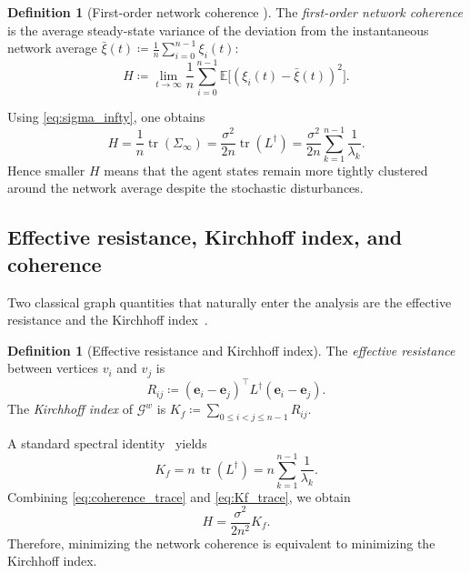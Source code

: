 \documentclass[11pt]{article}
\numberwithin{equation}{section}
\theoremstyle{definition}
\newtheorem{definition}[theorem]{Definition}
\theoremstyle{remark}
\begin{document}
\begin{definition}[First-order network coherence \cite{Bamieh2012}]
	The \emph{first-order network coherence} is the average steady-state
	variance of the deviation from the instantaneous network average $\bar{\xi}(t)\coloneqq \frac{1}{n}\sum_{i=0}^{n-1}\xi_i(t)$:
	\begin{equation}\label{eq:coherence_def}
		H
		\coloneqq
		\lim_{t\to\infty}
		\frac{1}{n}
		\sum_{i=0}^{n-1}
		\mathbb{E}\bigl[(\xi_i(t)-\bar{\xi}(t))^2\bigr].
	\end{equation}
\end{definition}

Using \eqref{eq:sigma_infty}, one obtains
\begin{equation}\label{eq:coherence_trace}
	H
	=
	\frac{1}{n}\operatorname{tr}(\Sigma_\infty)
	=
	\frac{\sigma^2}{2n}\operatorname{tr}(L^\dagger)
	=
	\frac{\sigma^2}{2n}\sum_{k=1}^{n-1}\frac{1}{\lambda_k}.
\end{equation}
Hence smaller $H$ means that the agent states remain more tightly clustered
around the network average despite the stochastic disturbances.

\subsection{Effective resistance, Kirchhoff index, and coherence}

Two classical graph quantities that naturally enter the analysis are the
effective resistance and the Kirchhoff index~\cite{Klein1993}.

\begin{definition}[Effective resistance and Kirchhoff index]
	\label{def:resistance}
	The \emph{effective resistance} between vertices $v_i$ and $v_j$ is
	\begin{equation}\label{eq:resistance_def}
		R_{ij}
		\coloneqq
		(\boldsymbol{e}_i-\boldsymbol{e}_j)^\top
		L^\dagger
		(\boldsymbol{e}_i-\boldsymbol{e}_j).
	\end{equation}
	The \emph{Kirchhoff index} of $\mathcal{G}^{w}$ is $K_f
	\coloneqq
	\sum_{0\le i<j\le n-1} R_{ij}$.
\end{definition}

A standard spectral identity~\cite{Bapat2010} yields
\begin{equation}\label{eq:Kf_trace}
	K_f
	=
	n\,\operatorname{tr}(L^\dagger)
	=
	n\sum_{k=1}^{n-1}\frac{1}{\lambda_k}.
\end{equation}
Combining \eqref{eq:coherence_trace} and \eqref{eq:Kf_trace}, we obtain
\[
H=\frac{\sigma^2}{2n^2}K_f.
\]
Therefore, minimizing the network coherence is equivalent to minimizing the
Kirchhoff index.
\end{document}
